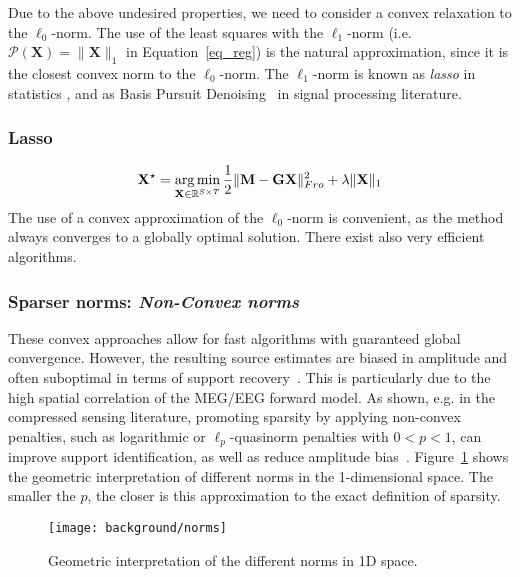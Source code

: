 Due to the above undesired properties, we need to consider a convex relaxation to the $\ell_0$-norm. The use of the least squares with the $\ell_1$-norm (i.e. $\mathcal{P}(\mathbf{X})=\|\mathbf{X}\|_1$ in Equation~\eqref{eq_reg}) is the natural approximation, since it is the closest convex norm to the $\ell_0$-norm. The $\ell_1$-norm is known as \textit{lasso} in statistics \cite{tibshirani1996regression}, and as Basis Pursuit Denoising~\cite{chen2001atomic} in signal processing literature.

\adjustwidth{1em}{0pt}
\subsubsection*{Lasso}
\begin{equation} \label{eq_lasso}
	\mathbf{X}^\star = \mathop{\mathrm{arg}\,\mathrm{min}}_{\mathbf{X}\in\mathbb{R}^{S\times T}}\frac{1}{2}\|\mathbf{M}-\mathbf{GX}\|_{Fro}^2 + \lambda\|\mathbf{X}\|_1
\end{equation}
\endadjustwidth
The use of a convex approximation of the $\ell_0$-norm is convenient, as the method always converges to a globally optimal solution. There exist also very efficient algorithms.

\subsubsection*{Sparser norms: \textit{Non-Convex norms}}
These convex approaches allow for fast algorithms with guaranteed global convergence. However, the resulting source estimates are biased in amplitude and often suboptimal in terms of support recovery~\cite{candes2008enhancing}. This is particularly due to the high spatial correlation of the MEG/EEG forward model. As shown, e.g. in the compressed sensing literature, promoting sparsity by applying non-convex penalties, such as logarithmic or $\ell_p$-quasinorm penalties with $0 < p < 1$, can improve support identification, as well as reduce amplitude bias~\cite{candes2008enhancing,chartrand2007exact,saab2008stable}. Figure~\ref{fig:norms} shows the geometric interpretation of different norms in the 1-dimensional space. The smaller the $p$, the closer is this approximation to the exact definition of sparsity. 

\begin{figure}
\centering
	\texttt{[image: background/norms]}
    \caption{Geometric interpretation of the different norms in 1D space.}
	\label{fig:norms}
\end{figure}

